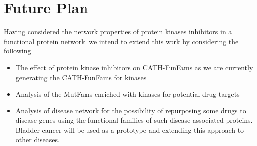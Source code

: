 \documentclass[a4paper, 11pt]{report}
\begin{document}
\section{Future Plan}
Having considered the network properties of protein kinases inhibitors in a functional protein network, we intend to extend this work by considering the following
\begin{itemize}
	\item The effect of protein kinase inhibitors on CATH-FunFams as we are currently generating the CATH-FunFams for kinases
	\item Analysis of the MutFams enriched with kinases for potential drug targets
	\item Analysis of disease network for the possibility of repurposing some drugs to disease genes using the functional families of such disease associated proteins. Bladder cancer will be used as a prototype and extending this approach to other diseases.
\end{itemize}
\end{document}
